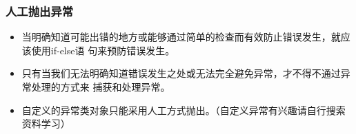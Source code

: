 \begin{frame}[fragile] %
\frametitle{人工抛出异常}




\begin{itemize}
\item 当明确知道可能出错的地方或能够通过简单的检查而有效防止错误发生，就应该使用if-else语
  句来预防错误发生。
\item 只有当我们无法明确知道错误发生之处或无法完全避免异常，才不得不通过异常处理的方式来
  捕获和处理异常。
\item 自定义的异常类对象只能采用人工方式抛出。（自定义异常有兴趣请自行搜索资料学习）
\end{itemize}
\end{frame}


